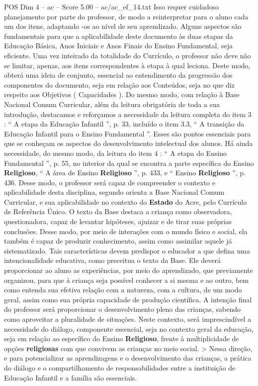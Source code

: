 \begin{textsample}{POS Dim 4 – ac – Score 5.00 – ac/ac\_ef\_14.txt}
Isso requer cuidadoso planejamento por parte do professor, de modo a reinterpretar para o aluno cada um dos itens, adaptando -os ao nível de seu aprendizado.
Alguns aspectos são fundamentais para que a aplicabilidade deste documento às duas etapas da Educação Básica, Anos Iniciais e Anos Finais do Ensino Fundamental, seja eficiente.
Uma vez inteirado da totalidade do Currículo, o professor não deve não se limitar, apenas, aos itens correspondentes à etapa à qual leciona.
Deste modo, obterá uma ideia de conjunto, essencial ao entendimento da progressão dos componentes do documento, seja em relação aos Conteúdos, seja no que diz respeito aos Objetivos ( Capacidades ).
Do mesmo modo, com relação à Base Nacional Comum Curricular, além da leitura obrigatória de toda a sua introdução, destacamos e reforçamos a necessidade da leitura completa do item 3 : “ A etapa da Educação Infantil ”, p. 33, incluído o item 3.3, “ A transição da Educação Infantil para o Ensino Fundamental ”.
Esses são pontos essenciais para que se conheçam os aspectos do desenvolvimento intelectual dos alunos.
Há ainda necessidade, do mesmo modo, da leitura do item 4 : “ A etapa do Ensino Fundamental ”, p. 55, no interior da qual se encontra a parte específica do Ensino \textbf{Religioso}, “ A área de Ensino \textbf{Religioso} ”, p. 433, e “ Ensino \textbf{Religioso} ”, p. 436.
Desse modo, o professor será capaz de compreender o contexto e aplicabilidade desta disciplina, segundo orienta a Base Nacional Comum Curricular, e sua aplicabilidade no contexto do \textbf{Estado} do Acre, pelo Currículo de Referência Único.
O texto da Base destaca a criança como observadora, questionadora, capaz de levantar hipóteses, ajuizar e de tirar suas próprias conclusões.
Desse modo, por meio de interações com o mundo físico e social, ela também é capaz de produzir conhecimento, assim como assimilar aquele já sistematizado.
Tais características devem predispor o educador a que defina uma intencionalidade educativa, como preceitua o texto da Base.
Ele deverá proporcionar ao aluno as experiências, por meio do aprendizado, que previamente organizou, para que à criança seja possível conhecer a si mesma e ao outro, bem como entenda sua efetiva relação com a natureza, com a cultura, de um modo geral, assim como sua própria capacidade de produção científica.
A intenção final do professor será proporcionar o desenvolvimento pleno das crianças, sabendo como aproveitar a pluralidade de situações.
Neste contexto, será imprescindível a necessidade do diálogo, componente essencial, seja no contexto geral da educação, seja em relação ao específico do Ensino \textbf{Religioso}, frente à multiplicidade de opções \textbf{religiosas} com que convivem as crianças no meio social. > Nessa direção, e para potencializar as aprendizagens e o desenvolvimento das crianças, a prática do diálogo e o compartilhamento de responsabilidades entre a instituição de Educação Infantil e a família são essenciais.

\end{textsample}
